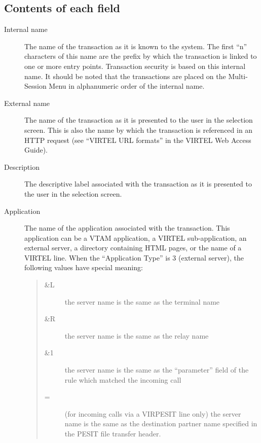 \documentclass[letterpaper,10pt,english]{sphinxmanual}
\begin{document}



\subsection{Contents of each field}
\label{\detokenize{connectivity_guide:id17}}\begin{description}
\item[{Internal name}] \leavevmode
The name of the transaction as it is known to the system. The first “n” characters of this name are the prefix by which the transaction is linked to one or more entry points. Transaction security is based on this internal name. It should be noted that the transactions are placed on the Multi-Session Menu in alphanumeric order of the internal name.

\item[{External name}] \leavevmode
The name of the transaction as it is presented to the user in the selection screen. This is also the name by which the transaction is referenced in an HTTP request (see “VIRTEL URL formats” in the VIRTEL Web Access Guide).

\item[{Description}] \leavevmode
The descriptive label associated with the transaction as it is presented to the user in the selection screen.

\item[{Application}] \leavevmode
The name of the application associated with the transaction. This application can be a VTAM application, a VIRTEL sub-application, an external server, a directory containing HTML pages, or the name of a VIRTEL line. When the “Application Type” is 3 (external server), the following values have special meaning:
\begin{quote}
\begin{description}
\item[{\&L}] \leavevmode
the server name is the same as the terminal name

\item[{\&R}] \leavevmode
the server name is the same as the relay name

\item[{\&1}] \leavevmode
the server name is the same as the “parameter” field of the rule which matched the incoming call

\item[{=}] \leavevmode
(for incoming calls via a VIRPESIT line only) the server name is the same as the destination partner name specified in the PESIT file transfer header.


\end{description}
\end{quote}
\end{description}
\end{document}

